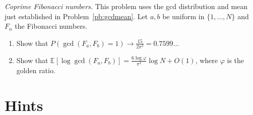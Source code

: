 \begin{exercise}[Journey]\label{pb:fibcoprime}
\emph{Coprime Fibonacci numbers.} This problem uses the gcd distribution and mean just established in Problem~\ref{pb:gcdmean}. Let $a,b$ be uniform in $\{1,\dots,N\}$ and $F_n$ the Fibonacci numbers.
\begin{enumerate}[label=(\alph*)]
\item Show that $P(\gcd(F_a,F_b)=1)\to\frac{15}{2\pi^2}=0.7599\ldots$
\item Show that $\mathbb E[\log\gcd(F_a,F_b)]=\frac{6\log\varphi}{\pi^2}\log N+O(1)$, where $\varphi$ is the golden ratio.
\end{enumerate}
\end{exercise}

\section{Hints}

